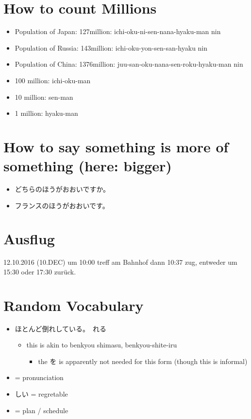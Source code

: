 \documentclass{article}
\begin{document}
\section{How to count Millions}
\begin{itemize}%
\item Population of Japan: 127million: ichi-oku-ni-sen-nana-hyaku-man nin
\item Population of Russia: 143million: ichi-oku-yon-sen-san-hyaku nin
\item Population of China: 1376million: juu-san-oku-nana-sen-roku-hyaku-man nin
\item 100 million: ichi-oku-man
\item 10 million: sen-man
\item 1 million: hyaku-man
\end{itemize}
\section{How to say something is more of something (here: bigger)}
\begin{itemize}
\item どちらのほうがおおいですか。
\item フランスのほうがおおいです。
\end{itemize}
\section{Ausflug}
12.10.2016 (10.DEC) um 10:00 treff am Bahnhof dann 10:37 zug, entweder um 15:30 oder 17:30 zurück.
\section{Random Vocabulary}
\begin{itemize}
\item ほとんど倒れしている。　れる		
\begin{itemize}
\item this is akin to benkyou shimasu, benkyou-shite-iru
\begin{itemize}
\item the を is apparently not needed for this form (though this is informal)
\end{itemize}
\end{itemize}
\item {} = pronunciation
\item {}しい = regretable
\item {} = plan / schedule
\end{itemize}
\end{document}
